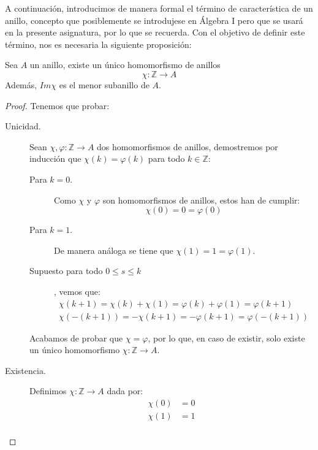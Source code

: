 A continuación, introducimos de manera formal el término de característica de un anillo, concepto que posiblemente se introdujese en Álgebra I pero que se usará en la presente asignatura, por lo que se recuerda. Con el objetivo de definir este término, nos es necesaria la siguiente proposición:
\begin{prop}
    Sea $A$ un anillo, existe un único homomorfismo de anillos
    \begin{equation*}
        \chi:\mathbb{Z}\to A
    \end{equation*}
    Además, $Im\chi$ es el menor subanillo de $A$.
    \begin{proof}
        Tenemos que probar:
        \begin{description}
            \item [Unicidad.] Sean $\chi,\varphi:\mathbb{Z}\to A$ dos homomorfismos de anillos, demostremos por inducción que $\chi(k) = \varphi(k)$ para todo $k\in \mathbb{Z}$:
                \begin{description}
                    \item [Para $k=0$.] Como $\chi$ y $\varphi$ son homomorfismos de anillos, estos han de cumplir: 
                        \begin{equation*}
                            \chi(0) = 0 = \varphi(0)
                        \end{equation*}
                    \item [Para $k=1$.] De manera análoga se tiene que $\chi(1) = 1 = \varphi(1)$.
                    \item [Supuesto para todo $0\leq s\leq k$], vemos que:
                        \begin{gather*}
                            \chi(k+1) = \chi(k) + \chi(1) = \varphi(k) + \varphi(1) = \varphi(k+1) \\
                            \chi(-(k+1)) = -\chi(k+1) = -\varphi(k+1) = \varphi(-(k+1))
                        \end{gather*}
                \end{description}
                Acabamos de probar que $\chi = \varphi$, por lo que, en caso de existir, solo existe un único homomorfismo $\chi:\mathbb{Z}\to A$.
            \item [Existencia.] Definimos $\chi:\mathbb{Z}\to A$ dada por:
                \begin{align*}
                    \chi(0) &= 0 \\
                    \chi(1) &= 1 \\

\end{align*}
\end{description}
\end{proof}
\end{prop}
